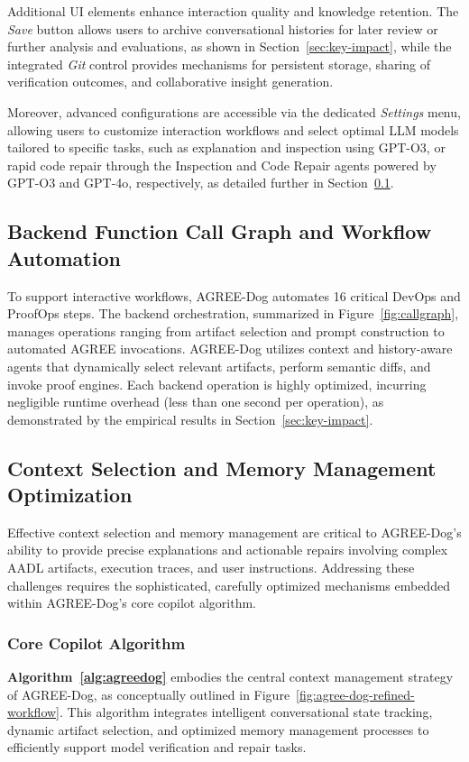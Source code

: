Additional UI elements enhance interaction quality and knowledge retention. The \textit{Save} button allows users to archive conversational histories for later review or further analysis and evaluations, as shown in Section~\ref{sec:key-impact}, while the integrated \textit{Git} control provides mechanisms for persistent storage, sharing of verification outcomes, and collaborative insight generation. 

Moreover, advanced configurations are accessible via the dedicated \textit{Settings} menu, %
allowing users to customize interaction workflows and select optimal LLM models tailored to specific tasks, such as explanation and inspection using GPT-O3, or rapid code repair through the Inspection and Code Repair agents powered by GPT-O3 and GPT-4o, respectively, as detailed further in Section~\ref{sec:workflow}.

\subsection{Backend Function Call Graph and Workflow Automation}
\label{sec:workflow}

To support interactive workflows, AGREE-Dog automates 16 critical DevOps and ProofOps steps. The backend orchestration, summarized in Figure~\ref{fig:callgraph}, manages operations ranging from artifact selection and prompt construction to automated AGREE invocations. AGREE-Dog utilizes context and history-aware agents that dynamically select relevant artifacts, perform semantic diffs, and invoke proof engines. Each backend operation is highly optimized, incurring negligible runtime overhead (less than one second per operation), as demonstrated by the empirical results in Section~\ref{sec:key-impact}.


\subsection{Context Selection and Memory Management Optimization}

Effective context selection and memory management are critical to AGREE-Dog’s ability to provide precise explanations and actionable repairs involving complex AADL artifacts, execution traces, and user instructions. Addressing these challenges requires the sophisticated, carefully optimized mechanisms embedded within AGREE-Dog’s core copilot algorithm.

\subsubsection{Core Copilot Algorithm}
\textbf{Algorithm~\ref{alg:agreedog}} embodies the central context management strategy of AGREE-Dog, as conceptually outlined in Figure~\ref{fig:agree-dog-refined-workflow}. This algorithm integrates intelligent conversational state tracking, dynamic artifact selection, and optimized memory management processes to efficiently support model verification and repair tasks.

